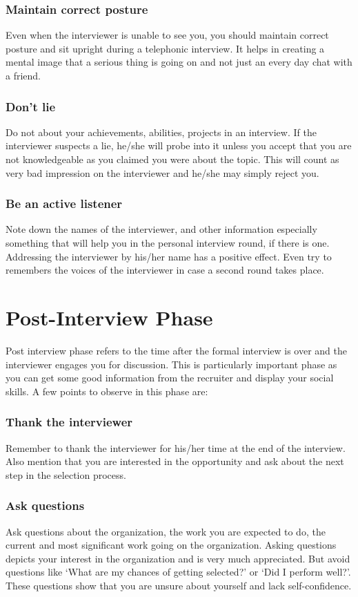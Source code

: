 \documentclass[a4paper,12pt]{report}
\begin{document}
\subsubsection{Maintain correct posture}
Even when the interviewer is unable to see you, you should maintain correct posture and sit upright during a
telephonic interview. It helps in creating a mental image that a serious thing is going on and not just an every
day chat with a friend.
\subsubsection{Don't lie}
Do not about your achievements, abilities, projects in an interview. If the interviewer suspects a lie, he/she
will probe into it unless you accept that you are not knowledgeable as you claimed you were about the topic.
This will count as very bad impression on the interviewer and he/she may simply reject you.
\subsubsection{Be an active listener}
Note down the names of the interviewer, and other information especially something that will help you in 
the personal interview round, if there is one. Addressing the interviewer by his/her name has a positive effect.
Even try to remembers the voices of the interviewer in case a second round takes place.
\section{Post-Interview Phase}
Post interview phase refers to the time after the formal interview is over and the interviewer engages you 
for discussion. This is particularly important phase as you can get some good information from the recruiter
and display your social skills. A few points to observe in this phase are:
\subsubsection{Thank the interviewer}
Remember to thank the interviewer for his/her time at the end of the interview. Also mention that you are interested 
in the opportunity and ask about the next step in the selection process.
\subsubsection{Ask questions}
Ask questions about the organization, the work you are expected to do, the current and most significant work 
going on the organization. Asking questions depicts your interest in the organization and is very much appreciated.
But avoid questions like `What are my chances of getting selected?' or `Did I perform well?'. These questions
show that you are unsure about yourself and lack self-confidence.
\end{document}
